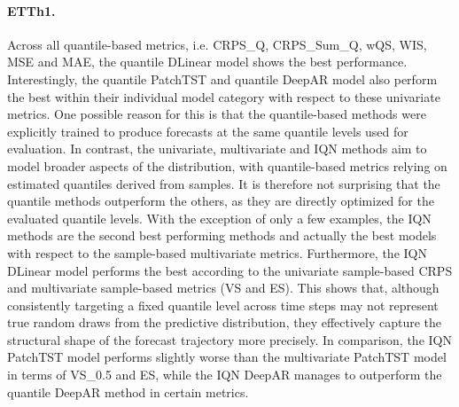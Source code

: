 \documentclass[a4paper,oneside,bibliography=totoc]{scrbook}
\begin{document}
\paragraph{ETTh1.}
Across all quantile-based metrics, i.e. CRPS\_Q, CRPS\_Sum\_Q, wQS, WIS, MSE and MAE, the quantile DLinear model shows the best performance.
Interestingly, the quantile PatchTST and quantile DeepAR model also perform the best within their individual model category with respect to these univariate metrics.
One possible reason for this is that the quantile-based methods were explicitly trained to produce forecasts at the same quantile levels used for evaluation. In contrast, the univariate, multivariate and IQN methods aim to model broader aspects of the distribution, with quantile-based metrics relying on estimated quantiles derived from samples. It is therefore not surprising that the quantile methods outperform the others, as they are directly optimized for the evaluated quantile levels.
With the exception of only a few examples, the IQN methods are the second best performing methods and actually the best models with respect to the sample-based multivariate metrics.
Furthermore, the IQN DLinear model performs the best according to the univariate sample-based CRPS and multivariate sample-based metrics (VS and ES).
This shows that, although consistently targeting a fixed quantile level across time steps may not represent true random draws from the predictive distribution, they effectively capture the structural shape of the forecast trajectory more precisely.
In comparison, the IQN PatchTST model performs slightly worse than the multivariate PatchTST model in terms of VS\_0.5 and ES, while the IQN DeepAR manages to outperform the quantile DeepAR method in certain metrics.
\end{document}
